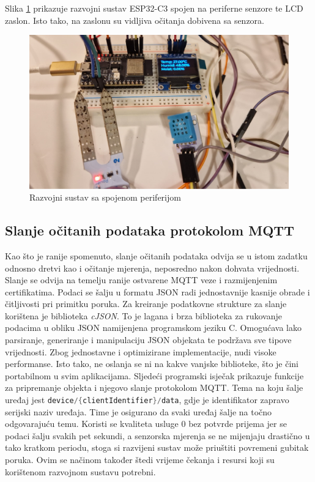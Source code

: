 Slika \ref{fig:complete_device} prikazuje razvojni sustav ESP32-C3 spojen na periferne senzore te LCD zaslon. Isto tako, na zaslonu su vidljiva očitanja dobivena sa senzora. 

\begin{figure}[ht]
	\centering
	\includegraphics[scale=0.2]{imgs/complete_device}
	\caption{Razvojni sustav sa spojenom periferijom}
	\label{fig:complete_device}
\end{figure}

\subsection{Slanje očitanih podataka protokolom MQTT}

Kao što je ranije spomenuto, slanje očitanih podataka odvija se u istom zadatku odnosno dretvi kao i očitanje mjerenja, neposredno nakon dohvata vrijednosti. Slanje se odvija na temelju ranije ostvarene MQTT veze i razmijenjenim certifikatima. Podaci se šalju u formatu JSON radi jednostavnije kasnije obrade i čitljivosti pri primitku poruka. Za kreiranje podatkovne strukture za slanje korištena je biblioteka \textit{cJSON}. To je lagana i brza biblioteka za rukovanje podacima u obliku JSON namijenjena programskom jeziku C. Omogućava lako parsiranje, generiranje i manipulaciju JSON objekata te podržava sve tipove vrijednosti. Zbog jednostavne i optimizirane implementacije, nudi visoke performanse. Isto tako, ne oslanja se ni na kakve vanjske biblioteke, što je čini portabilnom u svim aplikacijama. Sljedeći programski isječak prikazuje funkcije za pripremanje objekta i njegovo slanje protokolom MQTT. Tema na koju šalje uređaj jest \lstinline[language=c]|device/{clientIdentifier}/data|, gdje je identifikator zapravo serijski naziv uređaja. Time je osigurano da svaki uređaj šalje na točno odgovarajuću temu. Koristi se kvaliteta usluge 0  bez potvrde prijema jer se podaci šalju svakih pet sekundi, a senzorska mjerenja se ne mijenjaju drastično u tako kratkom periodu, stoga si razvijeni sustav može priuštiti povremeni gubitak poruka. Ovim se načinom također štedi vrijeme čekanja i resursi koji su korištenom razvojnom sustavu potrebni.  


